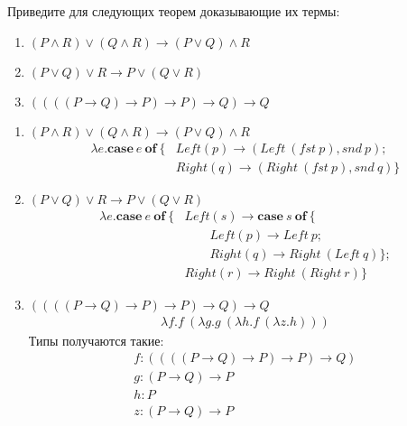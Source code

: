 \begin{task}[3]
Приведите для следующих теорем доказывающие их термы:
	\begin{enumerate}
		\item $(P \land R) \lor (Q \land R) \to (P \lor Q) \land R$
		\item $(P \lor Q) \lor R \to P \lor (Q \lor R)$
		\item $((((P \to Q) \to P) \to P) \to Q) \to Q$
	\end{enumerate}
\end{task}
\begin{solution}
\begin{enumerate}
\item $(P \land R) \lor (Q \land R) \to (P \lor Q) \land R$
\begin{align*}
	\lambda e.\mathbf{case}\ e\ \mathbf{of}\ \{ &Left(p) \to (Left\ (fst\ p), snd\ p); \\
	                                            &Right(q) \to (Right\ (fst\ p), snd\ q) \}
\end{align*}

\item $(P \lor Q) \lor R \to P \lor (Q \lor R)$
\begin{align*}
	\lambda e.\mathbf{case}\ e\ \mathbf{of}\ \{ &Left(s) \to \mathbf{case}\ s\ \mathbf{of}\ \{  \\
											   &\qquad Left(p) \to Left\ p; \\
	                                           &\qquad Right(q) \to Right\ (Left\ q) \}; \\
	                                            &Right(r) \to Right\ (Right\ r)  \}
\end{align*}

\item $((((P \to Q) \to P) \to P) \to Q) \to Q$
\begin{align*}
	\lambda f.f\ (\lambda g.g\ (\lambda h.f\ (\lambda z.h)))
\end{align*}
Типы получаются такие:
\[
\begin{array}{l}
	f : ((((P \to Q) \to P) \to P) \to Q)\\
	g : (P \to Q) \to P\\
    h : P\\
    z : (P \to Q) \to P
\end{array}
\]
\end{enumerate}
\xqed
\end{solution}


